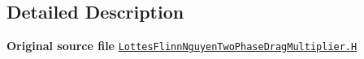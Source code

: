 \subsection{Detailed Description}
{\bfseries Original source file} \href{../../../home/carlo/data/GeN-Foam/GeN-Foam_ffn/GeN-Foam/GeN-Foam/classes/thermalHydraulics/src/physicsModels/dragModels/twoPhaseDragMultiplierModels/LottesFlinnNguyen/LottesFlinnNguyenTwoPhaseDragMultiplier.H}{\tt Lottes\+Flinn\+Nguyen\+Two\+Phase\+Drag\+Multiplier.\+H} 